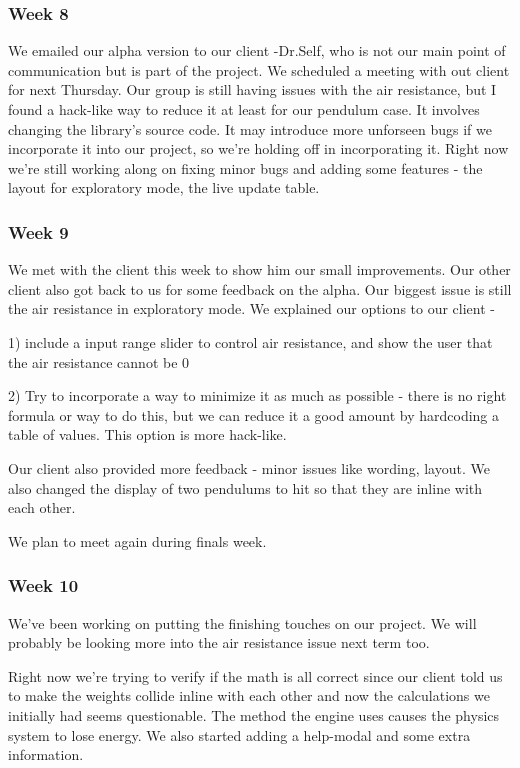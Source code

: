 \subsubsection{Week 8}
We emailed our alpha version to our client -Dr.Self, who is not our main point of communication but is part of the project. We scheduled a meeting with out client for next Thursday. 
Our group is still having issues with the air resistance, but I found a hack-like way to reduce it at least for our pendulum case. It involves changing the library's source code. It may introduce more unforseen bugs if we incorporate it into our project, so we're holding off in incorporating it. 
Right now we're still working along on fixing minor bugs and adding some features - the layout for exploratory mode, the live update table.

\subsubsection{Week 9}
We met with the client this week to show him our small improvements. Our other client also got back to us for some feedback on the alpha. Our biggest issue is still the air resistance in exploratory mode. We explained our options to our client -

1) include a input range slider to control air resistance, and show the user that the air resistance cannot be 0

2) Try to incorporate a way to minimize it as much as possible - there is no right formula or way to do this, but we can reduce it a good amount by hardcoding a table of values. This option is more hack-like. 

Our client also provided more feedback - minor issues like wording, layout. We also changed the display of two pendulums to hit so that they are inline with each other. 

We plan to meet again during finals week. 

\subsubsection{Week 10}
We've been working on putting the finishing touches on our project. We will probably be looking more into the air resistance issue next term too. 

Right now we're trying to verify if the math is all correct since our client told us to make the weights collide inline with each other and now the calculations we initially had seems questionable. The method the engine uses causes the physics system to lose energy. We also started adding a help-modal and some extra information. 

